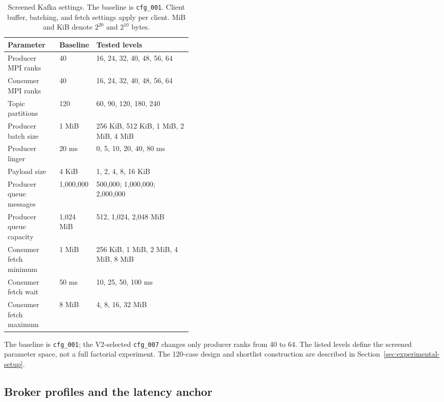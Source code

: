 \documentclass[10pt]{article}
\begin{document}
\begin{table}[!htbp]
\centering
\footnotesize
\begin{tabularx}{\linewidth}{@{}L{0.28\linewidth}L{0.14\linewidth}Y@{}}
\toprule
Parameter & Baseline & Tested levels \\
\midrule
Producer MPI ranks & 40 & 16, 24, 32, 40, 48, 56, 64 \\
Consumer MPI ranks & 40 & 16, 24, 32, 40, 48, 56, 64 \\
Topic partitions & 120 & 60, 90, 120, 180, 240 \\
Producer batch size & 1 MiB & 256 KiB, 512 KiB, 1 MiB, 2 MiB, 4 MiB \\
Producer linger & 20 ms & 0, 5, 10, 20, 40, 80 ms \\
Payload size & 4 KiB & 1, 2, 4, 8, 16 KiB \\
Producer queue messages & 1,000,000 & 500,000; 1,000,000; 2,000,000 \\
Producer queue capacity & 1,024 MiB & 512, 1,024, 2,048 MiB \\
Consumer fetch minimum & 1 MiB & 256 KiB, 1 MiB, 2 MiB, 4 MiB, 8 MiB \\
Consumer fetch wait & 50 ms & 10, 25, 50, 100 ms \\
Consumer fetch maximum & 8 MiB & 4, 8, 16, 32 MiB \\
\bottomrule
\end{tabularx}

\caption{Screened Kafka settings.  The baseline is \texttt{cfg\_001}.
Client buffer, batching, and fetch settings apply per client.
MiB and KiB denote $2^{20}$ and $2^{10}$ bytes.}
\label{tab:parameter-space}
\end{table}

The baseline is \texttt{cfg\_001}; the V2-selected \texttt{cfg\_007} changes only
producer ranks from 40 to 64. The listed levels define the screened parameter
space, not a full factorial experiment. The 120-case design and shortlist
construction are described in Section~\ref{sec:experimental-setup}.

\clearpage
\subsection{Broker profiles and the latency anchor}
\label{app:broker-settings}
\end{document}

